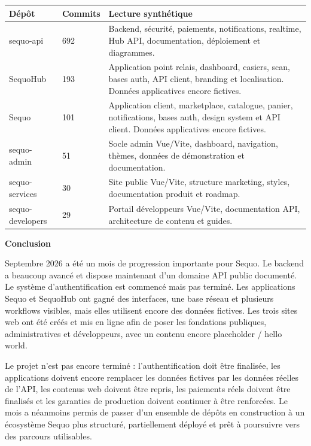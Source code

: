 \documentclass[11pt,letterpaper]{article}
\newcommand{\sectiontitle}[1]{%
  \vspace{0.55em}
  {\Large\bfseries\color{SequoInk}#1}\par
  \vspace{0.1em}
}
\begin{document}
{\small
\begin{tabularx}{\linewidth}{@{}L{3.3cm}L{2.0cm}Y@{}}
\toprule
{}
\textbf{Dépôt} & \textbf{Commits} & \textbf{Lecture synthétique} \\
\midrule
sequo-api & 692 & Backend, sécurité, paiements, notifications, realtime, Hub API, documentation, déploiement et diagrammes. \\
SequoHub & 193 & Application point relais, dashboard, casiers, scan, bases auth, API client, branding et localisation. Données applicatives encore fictives. \\
Sequo & 101 & Application client, marketplace, catalogue, panier, notifications, bases auth, design system et API client. Données applicatives encore fictives. \\
sequo-admin & 51 & Socle admin Vue/Vite, dashboard, navigation, thèmes, données de démonstration et documentation. \\
sequo-services & 30 & Site public Vue/Vite, structure marketing, styles, documentation produit et roadmap. \\
sequo-developers & 29 & Portail développeurs Vue/Vite, documentation API, architecture de contenu et guides. \\
\bottomrule
\end{tabularx}
}

\sectiontitle{Conclusion}
Septembre 2026 a été un mois de progression importante pour Sequo. Le backend a beaucoup avancé et dispose maintenant d'un domaine API public documenté. Le système d'authentification est commencé mais pas terminé. Les applications Sequo et SequoHub ont gagné des interfaces, une base réseau et plusieurs workflows visibles, mais elles utilisent encore des données fictives. Les trois sites web ont été créés et mis en ligne afin de poser les fondations publiques, administratives et développeurs, avec un contenu encore placeholder / hello world.

Le projet n'est pas encore terminé : l'authentification doit être finalisée, les applications doivent encore remplacer les données fictives par les données réelles de l'API, les contenus web doivent être repris, les paiements réels doivent être finalisés et les garanties de production doivent continuer à être renforcées. Le mois a néanmoins permis de passer d'un ensemble de dépôts en construction à un écosystème Sequo plus structuré, partiellement déployé et prêt à poursuivre vers des parcours utilisables.
\end{document}
